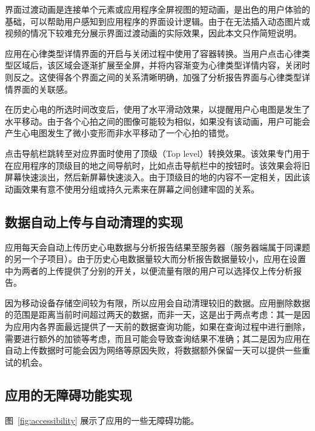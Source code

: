 界面过渡动画是连接单个元素或应用程序全屏视图的短动画，是出色的用户体验的基础，可以帮助用户感知到应用程序的界面设计逻辑。由于在无法插入动态图片或视频的情况下较难充分展示界面过渡动画的实际效果，因此本文只作简短说明。

应用在心律类型详情界面的开启与关闭过程中使用了容器转换。当用户点击心律类型区域后，该区域会逐渐扩展至全屏，并将内容渐变为心律类型详情内容，关闭时则反之。这使得各个界面之间的关系清晰明确，加强了分析报告界面与心律类型详情界面的关联感。

在历史心电的所选时间改变后，使用了水平滑动效果，以提醒用户心电图是发生了水平移动。由于各个心拍之间的图像可能较为相似，如果没有该动画，用户可能会产生心电图发生了微小变形而非水平移动了一个心拍的错觉。

点击导航栏跳转至对应界面时使用了顶级（Top level）转换效果。该效果专门用于在应用程序的顶级目的地之间导航时，比如点击导航栏中的按钮时。该效果会将旧屏幕快速淡出，然后新屏幕快速淡入。由于顶级目的地的内容不一定相关，因此该动画效果有意不使用分组或持久元素来在屏幕之间创建牢固的关系。

\subsection{数据自动上传与自动清理的实现}\label{subsec:data-auto-ui}

应用每天会自动上传历史心电数据与分析报告结果至服务器（服务器端属于同课题的另一个子项目）。由于历史心电数据量较大而分析报告数据量较小，应用在设置中为两者的上传提供了分别的开关，以便流量有限的用户可以选择仅上传分析报告。

因为移动设备存储空间较为有限，所以应用会自动清理较旧的数据。应用删除数据的范围是距离当前时间超过两天的数据，而非一天，这是出于两点考虑：其一是因为应用内各界面最远提供了一天前的数据查询功能，如果在查询过程中进行删除，需要进行额外的加锁等考虑，而且可能会导致查询结果不准确；其二是因为应用在自动上传数据时可能会因为网络等原因失败，将数据额外保留一天可以提供一些重试的机会。

\subsection{应用的无障碍功能实现}\label{subsec:accessibility-ui}

图~\ref{fig:accessibility} 展示了应用的一些无障碍功能。

